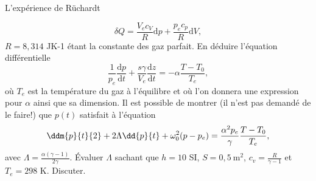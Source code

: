 \begin{exo}[PC][2][oral]{L'expérience de Rüchardt}
{\begin{quest}
  \begin{equation}
  \delta Q = \dfrac{V_e c_V}{R} \mathrm{d} p + \dfrac{p_e c_p}{R} \mathrm{d} V,
  \end{equation}
  $R=8,314$ {J}{}{K}{-1} étant la constante des gaz parfait. En déduire l'équation différentielle
  \begin{equation}
  \dfrac{1}{p_e} \dfrac{\mathrm{d} p}{\mathrm{d}t} + \dfrac{s \gamma}{V_e}  \dfrac{\mathrm{d} z}{\mathrm{d}t}  = -\alpha \dfrac{T-T_0}{T_e},
  \end{equation}
  où $T_e$ est la température du gaz à l'équilibre et où l'on donnera une expression pour $\alpha$ ainsi que sa dimension. Il est possible de montrer (il n'est pas demandé de le faire!) que $p(t)$ satisfait à l'équation
  \begin{equation}
  \ddm{p}{t}{2} + 2 \Lambda \dd{p}{t} + \omega_0^2 (p-p_e) = \dfrac{\alpha^2 p_e}{\gamma} \dfrac{T-T_0}{T_e},
  \end{equation}
  avec $\Lambda = \frac{\alpha (\gamma-1)}{2 \gamma}$. Évaluer $\Lambda$ sachant que $h = 10$ SI, $S=0,5 ~\text{m}^2$, $c_v = \frac{R}{\gamma-1}$ et $T_e = 298$ K. Discuter.
  \end{quest}
  }
  \end{exo}

